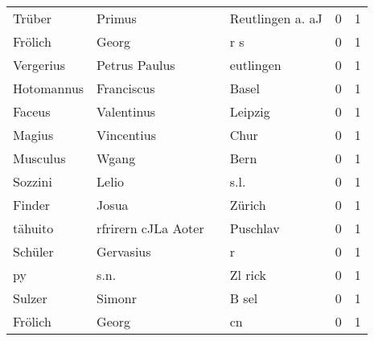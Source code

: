 \begin{center}
\begin{tiny}
\begin{longtabu}{llllrr}
                   Trüber &                             Primus &             &                            Reutlingen a. aJ &          0 &         1 \\
                  Frölich &                              Georg &             &                                         r s &          0 &         1 \\
                Vergerius &                      Petrus Paulus &             &                                   eutlingen &          0 &         1 \\
               Hotomannus &                         Franciscus &             &                                       Basel &          0 &         1 \\
                   Faceus &                         Valentinus &             &                                     Leipzig &          0 &         1 \\
                   Magius &                         Vincentius &             &                                        Chur &          0 &         1 \\
                 Musculus &                              Wgang &             &                                        Bern &          0 &         1 \\
                  Sozzini &                              Lelio &             &                                        s.l. &          0 &         1 \\
                   Finder &                              Josua &             &                                      Zürich &          0 &         1 \\
                  tähuito &                rfrirern cJLa Aoter &             &                                    Puschlav &          0 &         1 \\
                  Schüler &                          Gervasius &             &                                           r &          0 &         1 \\
                       py &                               s.n. &             &                                     Zl rick &          0 &         1 \\
                   Sulzer &                             Simonr &             &                                       B sel &          0 &         1 \\
                  Frölich &                              Georg &             &                                          cn &          0 &         1 \\

\end{longtabu}
\end{tiny}
\end{center}
